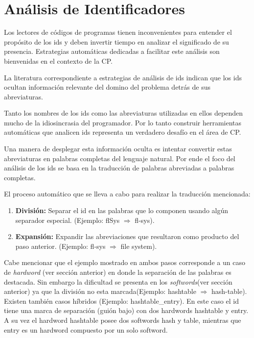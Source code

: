 \documentclass[12pt]{report}
\begin{document}
\pagebreak
\section{Análisis de Identificadores}

Los lectores de códigos de programas tienen inconvenientes para entender el propósito de los ids y deben invertir tiempo en analizar el significado de su presencia. Estrategias automáticas dedicadas a facilitar este análisis son bienvenidas en el contexto de la CP.

La literatura correspondiente a estrategias de análisis de ids indican que los ids ocultan información relevante del domino del problema detrás de sus abreviaturas\cite{EHPV09,LFBEX07}.

Tanto los nombres de los ids como las abreviaturas utilizadas en ellos dependen mucho de la idiosincrasia del programador. Por lo tanto construir herramientas automáticas que analicen ids representa un verdadero desafío en el área de CP. 

Una manera de desplegar esta información oculta es intentar convertir estas abreviaturas en palabras completas del lenguaje natural. Por ende el foco del análisis de los ids se basa en la traducción de palabras abreviadas a palabras completas.


El proceso automático que se lleva a cabo para realizar la traducción mencionada\cite{LFBEX07}:

\begin{enumerate}
\itemsep0em%
\item \textbf{División:} Separar el id en las palabras que lo componen usando algún separador especial. (Ejemplo: \textsf{flSys} $\Rightarrow$ \textsf{fl-sys}).

\item \textbf{Expansión:} Expandir las abreviaciones que resultaron como producto del paso anterior. (Ejemplo: \textsf{fl-sys} $\Rightarrow$ \textsf{file system}).
\end{enumerate}

Cabe mencionar que el ejemplo mostrado en ambos pasos corresponde a un caso de \textit{hardword} (ver sección anterior) en donde la separación de las palabras es destacada. Sin embargo la dificultad se presenta en los \textit{softwords}(ver sección anterior) ya que la división no esta marcada(Ejemplo: \textsf{hashtable} $\Rightarrow$ \textsf{hash-table}). Existen también casos híbridos (Ejemplo: \textsf{hashtable\_entry}). En este caso el id tiene una marca de separación (guión bajo) con dos hardwords \textsf{hashtable} y \textsf{entry}. A su vez el hardword \textsf{hashtable} posee dos softwords \textsf{hash} y \textsf{table}, mientras que \textsf{entry} es un hardword compuesto por un solo softword. 
\end{document}
